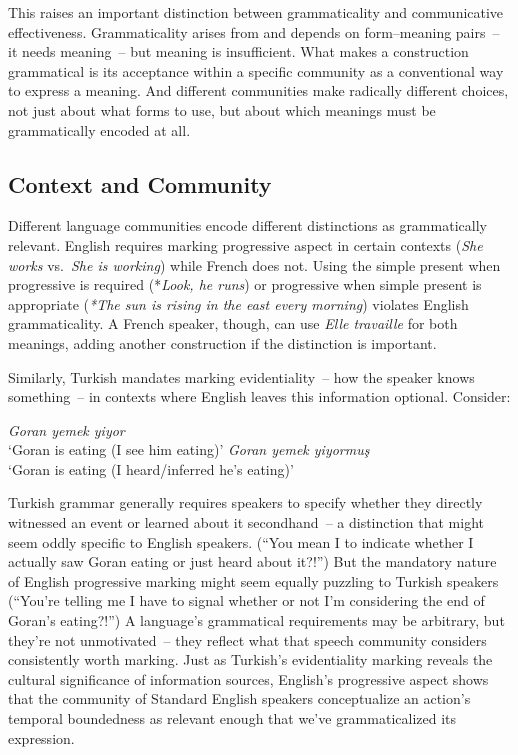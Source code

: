 This raises an important distinction between grammaticality and communicative effectiveness. Grammaticality arises from and depends on form--meaning pairs~-- it needs meaning~-- but meaning is insufficient. What makes a construction grammatical is its acceptance within a specific community as a conventional way to express a meaning. And different communities make radically different choices, not just about what forms to use, but about which meanings must be grammatically encoded at all.

\subsection{Context and Community}

Different language communities encode different distinctions as grammatically relevant. English requires marking progressive aspect in certain contexts (\textit{She works} vs.\ \textit{She is working}) while French does not. Using the simple present when progressive is required (*\textit{Look, he runs}) or progressive when simple present is appropriate (\textit{*The sun is rising in the east every morning}) violates English grammaticality. A French speaker, though, can use \textit{Elle travaille} for both meanings, adding another construction if the distinction is important.

Similarly, Turkish mandates marking evidentiality~-- how the speaker knows something~-- in contexts where English leaves this information optional. Consider:

\ea
\ea \textit{Goran yemek yiyor}\\`Goran is eating (I see him eating)'
\ex \textit{Goran yemek yiyormuş}\\`Goran is eating (I heard/inferred he's eating)'
\z\z

Turkish grammar generally requires speakers to specify whether they directly witnessed an event or learned about it secondhand~-- a distinction that might seem oddly specific to English speakers. (``You mean I  to indicate whether I actually saw Goran eating or just heard about it?!'') But the mandatory nature of English progressive marking might seem equally puzzling to Turkish speakers (``You're telling me I have to signal whether or not I'm considering the end of Goran's eating?!'') A language's grammatical requirements may be arbitrary, but they're not unmotivated~-- they reflect what that speech community considers consistently worth marking. Just as Turkish's evidentiality marking reveals the cultural significance of information sources, English's progressive aspect shows that the community of Standard English speakers conceptualize an action's temporal boundedness as relevant enough that we've grammaticalized its expression.

